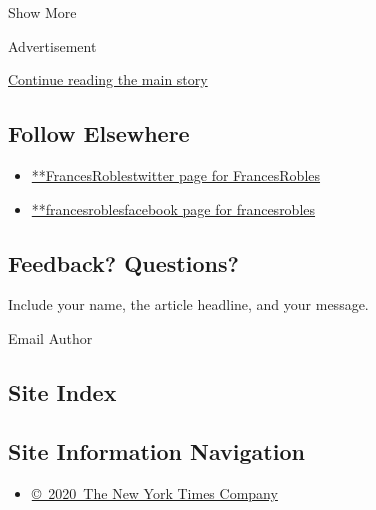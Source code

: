 Show More

Advertisement

\protect\hyperlink{after-mid2}{Continue reading the main story}

\hypertarget{follow-elsewhere}{%
\subsection{Follow Elsewhere}\label{follow-elsewhere}}

\begin{itemize}
\tightlist
\item
  \href{https://twitter.com/FrancesRobles}{**FrancesRoblestwitter page
  for FrancesRobles}
\item
  \href{https://www.facebookcorewwwi.onion/francesrobles}{**francesroblesfacebook
  page for francesrobles}
\end{itemize}

\hypertarget{feedback-questions}{%
\subsection{Feedback? Questions?}\label{feedback-questions}}

Include your name, the article headline, and your message.

Email Author

\hypertarget{site-index}{%
\subsection{Site Index}\label{site-index}}

\hypertarget{site-information-navigation}{%
\subsection{Site Information
Navigation}\label{site-information-navigation}}

\begin{itemize}
\tightlist
\item
  \href{https://help.nytimes3xbfgragh.onion/hc/en-us/articles/115014792127-Copyright-notice}{©~2020~The
  New York Times Company}
\end{itemize}

